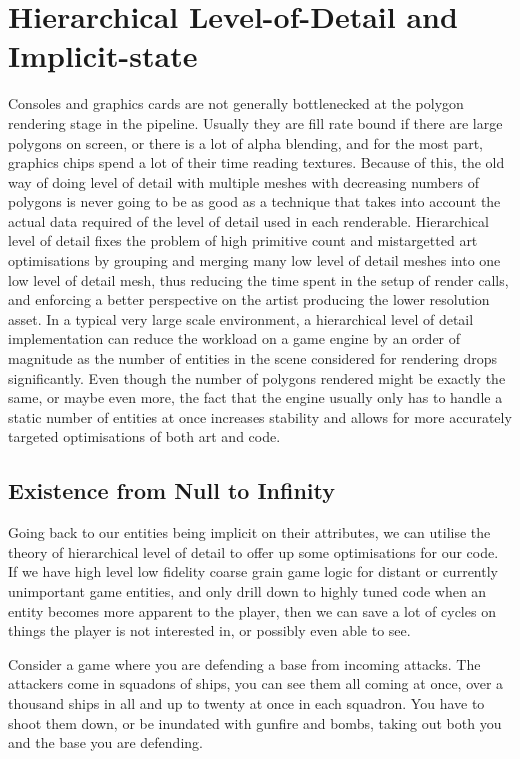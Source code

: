 \chapter[Hierarchical Level of Detail]{Hierarchical Level-of-Detail 
and Implicit-state}\label{chap:hier}

Consoles and graphics cards are not generally bottlenecked at the polygon
rendering stage in the pipeline. Usually they are fill rate bound if there are
large polygons on screen, or there is a lot of alpha blending, and for the most
part, graphics chips spend a lot of their time reading textures. Because of
this, the old way of doing level of detail with multiple meshes with decreasing
numbers of polygons is never going to be as good as a technique that takes into
account the actual data required of the level of detail used in each
renderable.  Hierarchical level of detail fixes the problem of high primitive
count and mistargetted art optimisations by grouping and merging many low level
of detail meshes into one low level of detail mesh, thus reducing the time
spent in the setup of render calls, and enforcing a better perspective on the
artist producing the lower resolution asset. In a typical very large scale
environment, a hierarchical level of detail implementation can reduce the
workload on a game engine by an order of magnitude as the number of entities in
the scene considered for rendering drops significantly. Even though the number
of polygons rendered might be exactly the same, or maybe even more, the fact
that the engine usually only has to handle a static number of entities at once
increases stability and allows for more accurately targeted optimisations of
both art and code.

\section[Existence]{Existence from Null to Infinity}

Going back to our entities being implicit on their attributes, we can utilise
the theory of hierarchical level of detail to offer up some optimisations for
our code. If we have high level low fidelity coarse grain game logic for distant
or currently unimportant game entities, and only drill down to highly tuned
code when an entity becomes more apparent to the player, then we can save a lot
of cycles on things the player is not interested in, or possibly even able to
see.

Consider a game where you are defending a base from incoming attacks. The
attackers come in squadons of ships, you can see them all coming at once, over
a thousand ships in all and up to twenty at once in each squadron. You have to
shoot them down, or be inundated with gunfire and bombs, taking out both you
and the base you are defending.


